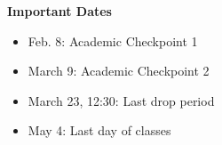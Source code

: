 \documentclass[12pt]{article}
\let\oldtextbf\textbf
\renewcommand{\textbf}[1]{\textcolor{coolblack}{\oldtextbf{#1}}}
\begin{document}
\begin{flushleft}
\textbf{Important Dates}
\end{flushleft}

\begin{itemize}
\item Feb. 8: Academic Checkpoint 1	
\item March 9: Academic Checkpoint 2	
\item March 23, 12:30: Last drop period
\item May 4: Last day of classes

\end{itemize}
\end{document}

